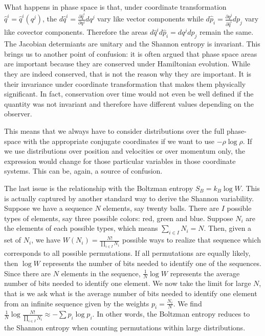 \documentclass{article}
\begin{document}
What happens in phase space is that, under coordinate transformation $\hat{q}^i = \hat{q}^i(q^j)$, the $d\hat{q}^i = \frac{\partial \hat{q}^i}{\partial q^j } dq^j$ vary like vector components while $d\hat{p}_i = \frac{\partial q^j}{\partial \hat{q}^i } dp_j$ vary like covector components. Therefore the areas $d\hat{q}^i d\hat{p}_i = dq^j dp_j$ remain the same. The Jacobian determiants are unitary and the Shannon entropy is invariant. This brings us to another point of confusion: it is often argued that phase space areas are important because they are conserved under Hamiltonian evolution. While they are indeed conserved, that is not the reason why they are important. It is their invariance under coordinate transformation that makes them physically significant. In fact, conservation over time would not even be well defined if the quantity was not invariant and therefore have different values depending on the observer.

This means that we always have to consider distributions over the full phase-space with the appropriate conjugate coordinates if we want to use $-\rho \log \rho$. If we use distributions over position and velocities or over momentum only, the expression would change for those particular variables in those coordinate systems. This can be, again, a source of confusion.\cite{Dunkel}

The last issue is the relationship with the Boltzman entropy $S_B= k_B \log W$. This is actually captured by another standard way to derive the Shannon variability. Suppose we have a sequence $N$ elements, say twenty balls. There are $I$ possible types of elements, say three possible colors: red, green and blue. Suppose $N_i$ are the elements of each possible types, which means $\sum_{i \in I} N_i = N$. Then, given a set of $N_i$, we have $W(N_i) = \frac{N!}{\prod_{i \in I} N_i}$ possible ways to realize that sequence which corresponds to all possible permutations. If all permutations are equally likely, then $\log W$ represents the number of bits needed to identify one of the sequences. Since there are $N$ elements in the sequence, $\frac{1}{N} \log W$ represents the average number of bits needed to identify one element. We now take the limit for large $N$, that is we ask what is the average number of bits needed to identify one element from an infinite sequence given by the weights $p_i = \frac{N_i}{N}$. We find $\frac{1}{N} \log \frac{N!}{\prod_{i \in I} N_i} \approx - \sum p_i \log p_i$. In other words, the Boltzman entropy reduces to the Shannon entropy when counting permutations within large distributions.
\end{document}
